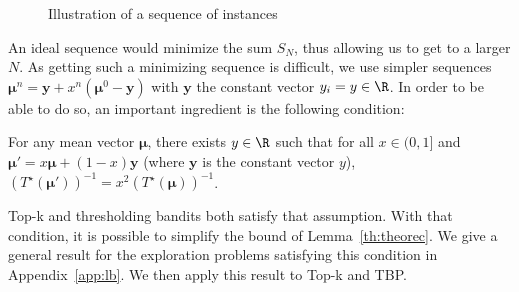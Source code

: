 \begin{figure}[!ht] \centering
	\caption{Illustration of a sequence of instances}
	\label{fig:seqinst}
\end{figure}


An ideal sequence would minimize the sum $S_N$, thus allowing us to get to a larger $N$.
As getting such a minimizing sequence is difficult, we use simpler sequences $\bm\mu^n = \bm y +x^n(\bm\mu^0-\bm y)$ with $\bm y$ the constant vector $y_i=y\in \R$.
In order to be able to do so, an important ingredient is the following condition:

\begin{assumption}\label{asm:aff}
	For any mean vector $\bm\mu$, there exists $y\in \R$ such that for all $x \in (0, 1]$ and $\bm\mu' = x\bm\mu + (1-x)\bm y$ (where $\bm y$ is the constant vector $y$), $(T^\star(\bm\mu'))^{-1}=x^2(T^\star(\bm\mu))^{-1}$.
\end{assumption}

Top-k and thresholding bandits both satisfy that assumption.
With that condition, it is possible to simplify the bound of Lemma~\ref{th:theorec}. We give a general result for the exploration problems satisfying this condition in Appendix~\ref{app:lb}. We then apply this result to Top-k and TBP.	
	
